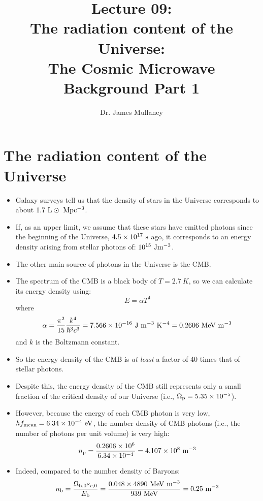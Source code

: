 \documentclass[11pt]{article}
\newcommand{\vep}[1]{\ensuremath{\varepsilon#1}}
\begin{document}
 
\title{Lecture 09:\\The radiation content of the Universe:\\The Cosmic Microwave Background Part 1}
\author{Dr. James Mullaney}
\maketitle

\section{The radiation content of the Universe}
\begin{itemize}
\item Galaxy surveys tell us that the density of stars in the Universe corresponds to about $1.7~{\rm L\odot~Mpc^{-3}}$.
\item If, as an upper limit, we assume that these stars have emitted photons since the beginning of the Universe, $4.5\times10^{17}~{\rm s}$ ago, it corresponds to an energy density arising from stellar photons of: $10^{15}~{\rm J m^{-3}}$.
\item The other main source of photons in the Universe is the CMB.
\item The spectrum of the CMB is a black body of $T=2.7~K$, so we can calculate its energy density using:
\begin{equation}
E = \alpha T^4
\end{equation}
where
\begin{equation}
\alpha=\frac{\pi^2}{15}\frac{k^4}{\hbar^3 c^3}=7.566\times10^{-16}~{\rm J~m^{-3}~K^{-4}}=0.2606~{\rm MeV~m^{-3}}
\end{equation}
and $k$ is the Boltzmann constant.
\item So the energy density of the CMB is {\it at least} a factor of 40 times that of stellar photons.
\item Despite this, the energy density of the CMB still represents only a small fraction of the critical density of our Universe (i.e., $\Omega_{\rm p} = 5.35\times10^{-5}$).
\item However, because the energy of each CMB photon is very low, $hf_{\rm mean}=6.34\times10^{-4}~{\rm eV}$, the number density of CMB photons (i.e., the number of photons per unit volume) is very high:
\begin{equation}
n_{\rm p} = \frac{0.2606\times10^6}{6.34\times10^{-4}}=4.107\times10^8~{\rm m^{-3}}
\end{equation}
\item Indeed, compared to the number density of Baryons:
\begin{equation}
    n_{\rm b} = \frac{\Omega_{\rm b,0}\vep{_{c,0}}}{E_{\rm b}}=\frac{0.048\times4890~{\rm MeV~m^{-3}}}{939~{\rm MeV}} = 0.25~{\rm m^{-3}}
\end{equation}
\end{itemize}
\end{document}
